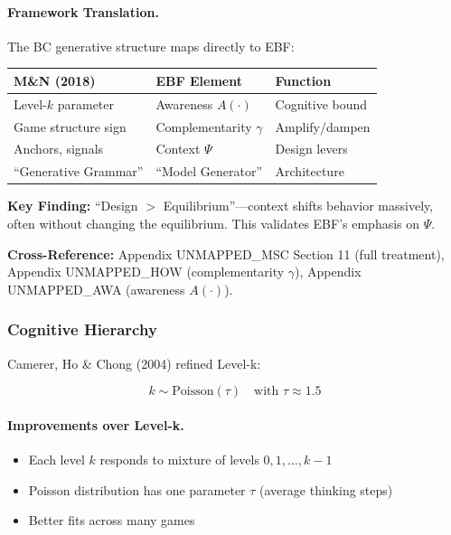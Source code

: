 \paragraph{Framework Translation.}
The BC generative structure maps directly to EBF:

\begin{center}
\renewcommand{\arraystretch}{1.3}
\begin{tabular}{@{}p{4.5cm}p{4.5cm}p{3.5cm}@{}}
\toprule
\textbf{M\&N (2018)} & \textbf{EBF Element} & \textbf{Function} \\
\midrule
Level-$k$ parameter & Awareness $A(\cdot)$ & Cognitive bound \\
Game structure sign & Complementarity $\gamma$ & Amplify/dampen \\
Anchors, signals & Context $\Psi$ & Design levers \\
``Generative Grammar'' & ``Model Generator'' & Architecture \\
\bottomrule
\end{tabular}
\end{center}

\textbf{Key Finding:} ``Design $>$ Equilibrium''---context shifts behavior massively,
often without changing the equilibrium. This validates EBF's emphasis on $\Psi$.

\textbf{Cross-Reference:} Appendix UNMAPPED_MSC Section 11 (full treatment),
Appendix UNMAPPED_HOW (complementarity $\gamma$), Appendix UNMAPPED_AWA (awareness $A(\cdot)$).

\subsubsection{Cognitive Hierarchy}

Camerer, Ho \& Chong (2004) refined Level-k:

\begin{equation}
\boxed{
k \sim \text{Poisson}(\tau) \quad \text{with } \tau \approx 1.5
}
\label{eq:ch}
\end{equation}

\paragraph{Improvements over Level-k.}
\begin{itemize}
    \item Each level $k$ responds to mixture of levels $0, 1, \ldots, k-1$
    \item Poisson distribution has one parameter $\tau$ (average thinking steps)
    \item Better fits across many games
\end{itemize}

